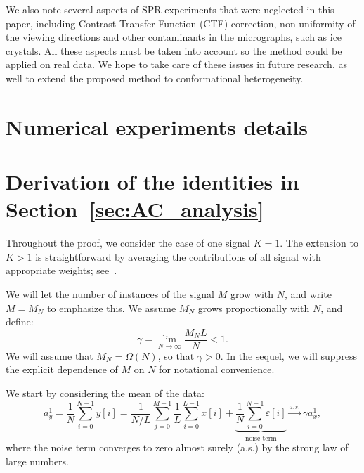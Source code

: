 \documentclass[9pt,twocolumn,twoside,lineno]{pnas-new}
\begin{document}

We also note several aspects of SPR experiments that were neglected in this paper, including Contrast Transfer Function (CTF) correction, non-uniformity of the viewing directions and other contaminants in the micrographs, such as ice crystals.
 All these aspects must be taken into account so the method could be applied on real data. We hope to take care of these issues in future research, as well to extend the proposed method to conformational heterogeneity. 





\appendix

\section{Numerical experiments details} \label{sec:numeric_details}



\section{Derivation of the identities in Section~\ref{sec:AC_analysis}} \label{sec:autocorrelation_computation}

Throughout the proof, we consider the case of one signal $K=1$. The extension to $K>1$ is straightforward by averaging the contributions of all signal with  appropriate weights; see~\cite{boumal2017heterogeneous}. 

We will let the number of instances of the signal $M$ grow with $N$, and write $M=M_N$ to emphasize this. We assume $M_N$ grows proportionally with $N$, and define:
%
\begin{equation}
\gamma = \lim_{N\to\infty} \frac{M_NL}{N}<1.
\end{equation}
%
We will assume that $M_N=\Omega(N)$, so that $\gamma>0$. In the sequel, we will suppress the explicit dependence of $M$ on $N$ for notational convenience.

We start by considering the mean of the data:
%
\begin{equation}
a_y^1 = \frac{1}{N}\sum_{i=0}^{N-1} y[i] =
\frac{1}{N/L}\sum_{j=0}^{M-1}\frac{1}{L}\sum_{i=0}^{L-1}x[i] +    
\underbrace{\frac{1}{N}\sum_{i=0}^{N-1}\varepsilon[i]}_{\text{noise term}}
\xrightarrow{a.s.}\gamma a_x^1,
\end{equation}
%
where the noise term converges to zero almost surely (a.s.) by the strong law of large numbers.
\end{document}
